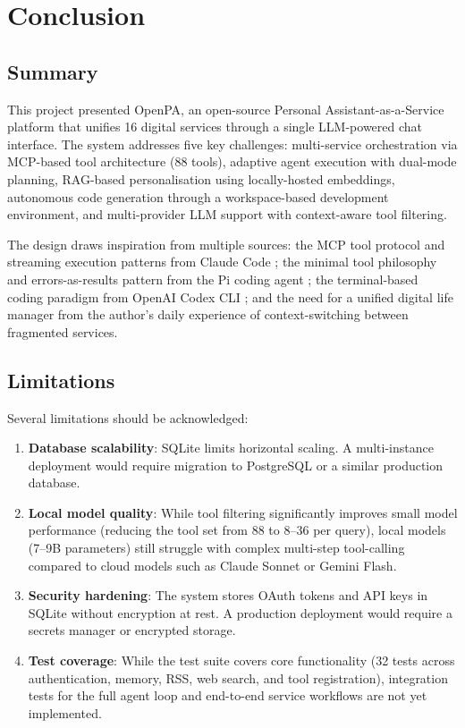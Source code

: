 \section{Conclusion}
\label{sec:conclusion}

\subsection{Summary}

This project presented OpenPA, an open-source Personal Assistant-as-a-Service platform that unifies 16 digital services through a single LLM-powered chat interface. The system addresses five key challenges: multi-service orchestration via MCP-based tool architecture (88 tools), adaptive agent execution with dual-mode planning, RAG-based personalisation using locally-hosted embeddings, autonomous code generation through a workspace-based development environment, and multi-provider LLM support with context-aware tool filtering.

The design draws inspiration from multiple sources: the MCP tool protocol and streaming execution patterns from Claude Code \cite{anthropic2025claudecode}; the minimal tool philosophy and errors-as-results pattern from the Pi coding agent \cite{badlogic2025pi}; the terminal-based coding paradigm from OpenAI Codex CLI \cite{openai2025codexcli}; and the need for a unified digital life manager from the author's daily experience of context-switching between fragmented services.

\subsection{Limitations}

Several limitations should be acknowledged:

\begin{enumerate}[leftmargin=*]
  \item \textbf{Database scalability}: SQLite limits horizontal scaling. A multi-instance deployment would require migration to PostgreSQL or a similar production database.

  \item \textbf{Local model quality}: While tool filtering significantly improves small model performance (reducing the tool set from 88 to 8--36 per query), local models (7--9B parameters) still struggle with complex multi-step tool-calling compared to cloud models such as Claude Sonnet or Gemini Flash.

  \item \textbf{Security hardening}: The system stores OAuth tokens and API keys in SQLite without encryption at rest. A production deployment would require a secrets manager or encrypted storage.

  \item \textbf{Test coverage}: While the test suite covers core functionality (32 tests across authentication, memory, RSS, web search, and tool registration), integration tests for the full agent loop and end-to-end service workflows are not yet implemented.
\end{enumerate}

